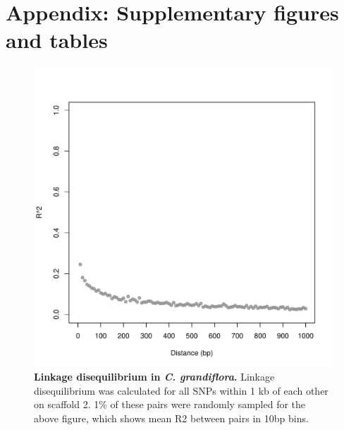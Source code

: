 \section{Appendix: Supplementary figures and tables}

\begin{figure}[h!]
      \centering
       \includegraphics[width=\linewidth]{Ch3FigS1}
    \caption{\textbf{Linkage disequilibrium in \textit{C. grandiflora}.} Linkage disequilibrium was calculated for all SNPs within 1 kb of each other on scaffold 2. 1\% of these pairs were randomly sampled for the above figure, which shows mean R2 between pairs in 10bp bins.}
    \label{fig:3figS1}
\end{figure}

